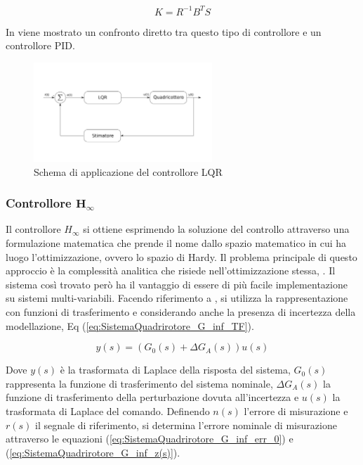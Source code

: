 \begin{equation}\label{eq:SistemaQuadrirotore_Ricatti_sol}
	K = R^{-1} B^T S
\end{equation}

In \cite{PID_vs_LQ} viene mostrato un confronto diretto tra questo tipo di controllore e un controllore PID.

\begin{figure}
	\centering
	\includegraphics[width=0.6\textwidth]{SistemaQuadrirotore/Figure/LQR}
	\caption{Schema di applicazione del controllore LQR}
\end{figure}
 

\subsubsection{Controllore $\mathbf{H_\infty}$}

Il controllore $H_\infty$ si ottiene esprimendo la soluzione del controllo attraverso una formulazione matematica che prende il nome dallo spazio matematico in cui ha luogo l'ottimizzazione, ovvero lo spazio di Hardy. Il problema principale di questo approccio è la complessità analitica che risiede nell'ottimizzazione stessa, \cite{GrimbleM.J1991Hrcd}. Il sistema così trovato però ha il vantaggio di essere di più facile implementazione su sistemi multi-variabili. Facendo riferimento a \cite{GrimbleM.J1991Hrcd}, si utilizza la rappresentazione con funzioni di trasferimento e considerando anche la presenza di incertezza della modellazione, Eq (\ref{eq:SistemaQuadrirotore_G_inf_TF}).

\begin{equation}\label{eq:SistemaQuadrirotore_G_inf_TF}
	y(s) = \left(G_0(s) + \Delta G_A(s)\right) u(s) 
\end{equation}

Dove $y(s)$ è la trasformata di Laplace della risposta del sistema, $G_0(s)$ rappresenta la funzione di trasferimento del sistema nominale, $\Delta G_A(s)$ la funzione di trasferimento della perturbazione dovuta all'incertezza e $u(s)$ la trasformata di Laplace del comando.
Definendo $n(s)$ l'errore di misurazione e $r(s)$ il segnale di riferimento, si determina l'errore nominale di misurazione attraverso le equazioni (\ref{eq:SistemaQuadrirotore_G_inf_err_0}) e (\ref{eq:SistemaQuadrirotore_G_inf_z(s)}).


